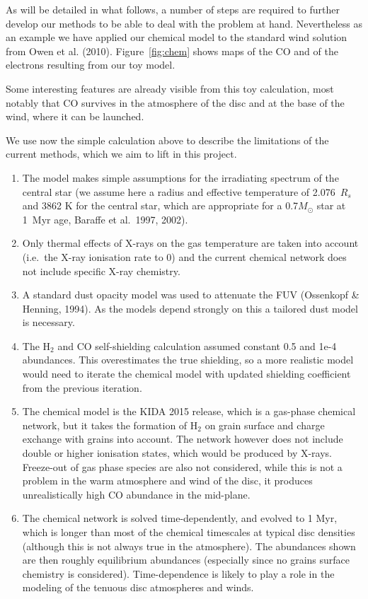 \documentclass[10pt,fleqn,twoside]{article}
\begin{document}
As will be detailed in what follows, a number of steps are required to
further develop our methods to be able to deal with the problem at
hand. Nevertheless as an example we have applied our chemical model to
the standard wind solution from Owen et
al. (2010). Figure~\ref{fig:chem} shows maps of the CO and of the
electrons resulting from our toy model. 


Some interesting features are already visible from this toy
calculation, most notably that CO survives in the atmosphere of the
disc and at the base of the wind, where it can be launched. 

We use now the simple calculation above to describe the limitations of
the current methods, which we aim to lift in this project. 

\begin{enumerate}
\item The model makes simple assumptions for the irradiating spectrum
of the central star (we assume here a radius and effective temperature
of 2.076~$R_s$ and 3862 K for the central star, which are appropriate
for a 0.7$M_{\odot}$ star at 1~Myr age, Baraffe et al.\ 1997, 2002).

\item Only thermal effects of X-rays on the gas
temperature are taken into account (i.e.\ the X-ray ionisation rate
to 0) and the current chemical network does not include specific
X-ray chemistry. 

\item A standard dust opacity model was used to attenuate
the FUV (Ossenkopf \& Henning, 1994). As the models depend strongly on
this a tailored dust model is necessary. 

\item The H$_2$ and CO self-shielding
calculation assumed constant 0.5 and 1e-4 abundances. This overestimates the true
shielding, so a more realistic model would need to iterate the
chemical model with updated shielding coefficient from the previous
iteration.

\item The chemical model is the KIDA 2015 release, which is a gas-phase
chemical network, but it takes the formation of H$_2$ on grain surface and
charge exchange with grains into account. The network however does not
include double or higher ionisation states, which would be produced by
X-rays. Freeze-out of gas phase species are also not considered, while
this is not a problem in the warm atmosphere and wind of the disc, it produces
unrealistically high CO abundance in the mid-plane. 

\item The chemical network is solved time-dependently, and evolved to 1 Myr,
which is longer than most of the chemical timescales at typical disc
densities (although this is not always true in the atmosphere). The
abundances shown are then roughly equilibrium abundances (especially since no
grains surface chemistry is considered). Time-dependence is likely to
play a role in the modeling of the tenuous disc atmospheres and
winds. 
\end{enumerate}
\end{document}
